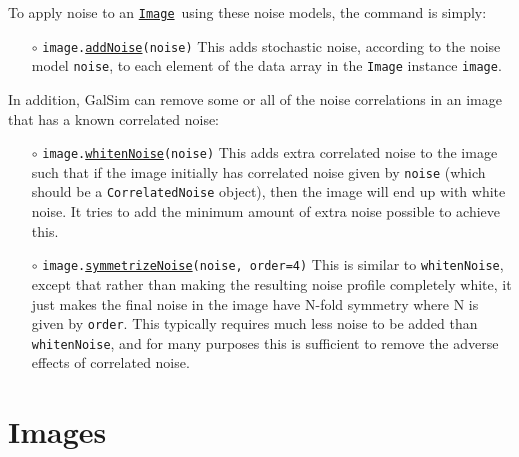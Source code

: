 \documentclass[preprint,10pt]{../../devel/modules/aastex}
\newcommand\Image{\href{http://galsim-developers.github.io/GalSim/classgalsim_1_1image_1_1_image.html}{\texttt{Image}}}
\begin{document}
To apply noise to an \Image\ using these noise models, the command is simply:

\begin{itemize}

  \item[$\circ$] 
  \texttt{image.\href{http://galsim-developers.github.io/GalSim/namespacegalsim_1_1noise.html\#aa45903c801b069774d5eafdbee54bda7}{addNoise}(noise)}
    \newline 
    This adds stochastic noise, according to the noise model \texttt{noise},
    to each element of the data array in the
    \texttt{Image} instance \texttt{image}.

\end{itemize}

In addition, GalSim can remove some or all of the noise correlations in an image that has 
a known correlated noise:

\begin{itemize}

  \item[$\circ$] 
  \texttt{image.\href{http://galsim-developers.github.io/GalSim/classgalsim_1_1correlatednoise_1_1___base_correlated_noise.html\#af39b3141a36a515022acabae5c973817}{whitenNoise}(noise)} 
    \newline 
    This adds extra correlated noise
    to the image such that if the image initially has correlated noise given by \texttt{noise}
    (which should be a \texttt{CorrelatedNoise} object), then the image will end up with
    white noise.  It tries to add the minimum amount of extra noise possible to achieve this.

  \item[$\circ$] 
  \texttt{image.\href{http://galsim-developers.github.io/GalSim/classgalsim_1_1correlatednoise_1_1___base_correlated_noise.html\#a8f4cb9995d9e097a35aaf87da1b72ec1}{symmetrizeNoise}(noise, order=4)} 
    \newline 
    This is similar to \texttt{whitenNoise}, 
    except that rather than making the resulting noise profile completely white, it just makes
    the final noise in the image have N-fold symmetry where N is given by \texttt{order}.
    This typically requires much less noise to be added than \texttt{whitenNoise}, and for
    many purposes this is sufficient to remove the adverse effects of correlated noise.
    
\end{itemize}

\section{Images}\label{sect:image}
\end{document}
